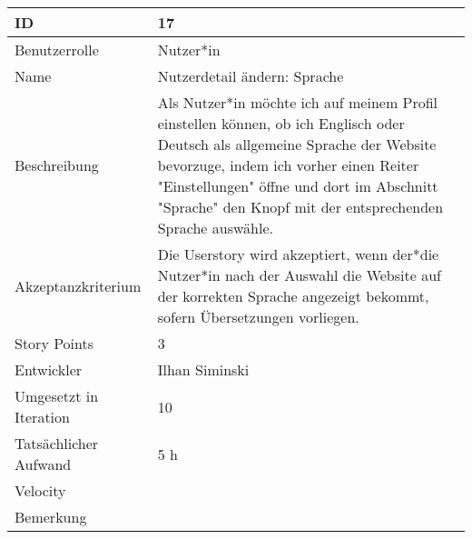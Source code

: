 \begin{tabularx}{\textwidth}{|p{}|X|}
	\hline
	ID & 17\\
	\hline
	Benutzerrolle & Nutzer*in\\
	\hline
	Name & Nutzerdetail ändern: Sprache \\
	\hline
	Beschreibung & Als Nutzer*in möchte ich auf meinem Profil einstellen können, ob ich Englisch oder Deutsch als allgemeine Sprache der Website bevorzuge, indem ich vorher einen Reiter "Einstellungen" öffne und dort im Abschnitt "Sprache" den Knopf mit der entsprechenden Sprache auswähle.\\
	\hline
	Akzeptanzkriterium & Die Userstory wird akzeptiert, wenn der*die Nutzer*in nach der Auswahl die Website auf der korrekten Sprache angezeigt bekommt, sofern Übersetzungen vorliegen. \\
	\hline
	Story Points & 3\\
	\hline
	Entwickler & Ilhan Siminski\\
	\hline
	Umgesetzt in Iteration & 10\\ 
	\hline
	Tatsächlicher Aufwand & 5 h\\
	\hline
	Velocity & \\
	\hline
	Bemerkung & \\
	\hline
\end{tabularx}
\vspace{20pt}
